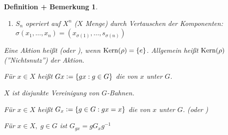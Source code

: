 \documentclass[a4paper,10pt,german]{scrbook}
\theoremstyle{saetze}
\theoremstyle{definitionen}
\newtheorem{DefBem}[Def]{Definition + Bemerkung}
\begin{document}
\begin{DefBem}
\begin{enum}
{\begin{enumerate}
                \item $S_n$ operiert auf $X^n$ ($X$ Menge) durch Vertauschen
                der Komponenten: $\sigma(x_1,\dots,x_n) = 
                (x_{\sigma(1)},\dots,s_{\sigma(n)})$
            \end{enumerate}
        }

        \item Eine Aktion heißt  (oder ), wenn 
        $\mathop{\rm Kern}\nolimits(\rho) = \{e\}$. \newline Allgemein heißt $\mathop{\rm Kern}\nolimits(\rho)$ 
         (''Nichtsnutz'') der Aktion.

\item Für $x \in X$ heißt $Gx \mathrel{\mathop:}= \{ gx : g \in G\}$ die 
von $x$ unter $G$.
\item $X$ ist disjunkte Vereinigung von $G$-Bahnen.

\item Für $x \in X$ heißt $G_x \mathrel{\mathop:}= \{ g \in G : gx = x\}$ die
 von $x$ unter $G$. (oder )
\item Für $x \in X,\; g \in G$ ist $G_{gx} = g G_{x} g^{-1}$

\end{enum}
\end{DefBem}
\end{document}
